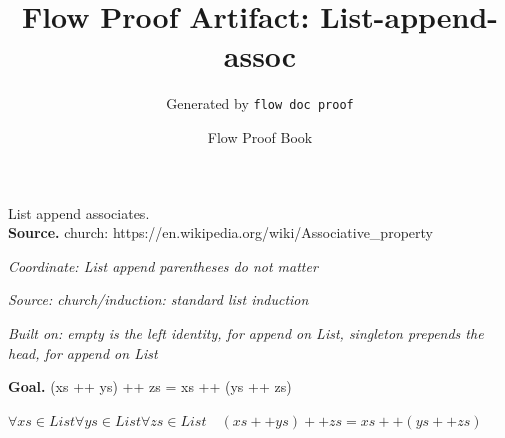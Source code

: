 \documentclass[11pt]{article}
\title{Flow Proof Artifact: List-append-assoc}
\author{Generated by \texttt{flow doc proof}}
\date{Flow Proof Book}
\theoremstyle{definition}
\begin{document}
\maketitle
List append associates.\\[0.5em]
\textbf{Source.} church: https://en.wikipedia.org/wiki/Associative\_property\\[0.5em]
\bigskip
{}\par
\smallskip\noindent\textit{Coordinate: List \cdot append \cdot parentheses do not matter}\par
\smallskip\noindent\textit{Source: church/induction: standard list induction}\par
\smallskip\noindent\textit{Built on: empty is the left identity, for append on List, singleton prepends the head, for append on List}\par
\medskip
\noindent\textbf{Goal.} (xs ++ ys) ++ zs = xs ++ (ys ++ zs)\par
\noindent$\displaystyle \forall xs \in List \forall ys \in List \forall zs \in List\quad (xs ++ ys) ++ zs = xs ++ (ys ++ zs)$\par
\medskip
\noindent
\end{document}
